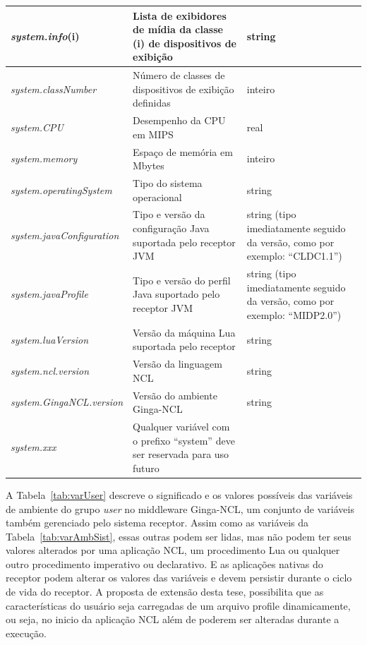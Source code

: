 \begin{table}[!ht]
{\begin{tabular}{|p{4.5cm}|p{6cm}|p{4.2cm}|}
    \textit{system.info}(i) & Lista de exibidores de mídia da classe (i) de dispositivos de exibição & string \\\hline
    \textit{system.classNumber} & Número de classes de dispositivos de exibição definidas & inteiro \\\hline
    \textit{system.CPU} & Desempenho da CPU em MIPS & real \\\hline
    \textit{system.memory} & Espaço de memória em Mbytes & inteiro \\\hline
    \textit{system.operatingSystem} & Tipo do sistema operacional & string \\\hline
    \textit{system.javaConfiguration} & Tipo e versão da configuração Java suportada pelo receptor JVM & string (tipo imediatamente seguido da versão, como por exemplo:         “CLDC1.1”) \\\hline
    \textit{system.javaProfile }& Tipo e versão do perfil Java suportado pelo receptor JVM & string (tipo imediatamente seguido da versão, como por exemplo: “MIDP2.0”) \\\hline
    \textit{system.luaVersion} & Versão da máquina Lua suportada pelo receptor & string \\\hline
    \textit{system.ncl.version} & Versão da linguagem NCL & string \\\hline
    \textit{system.GingaNCL.version} & Versão do ambiente Ginga-NCL & string \\\hline
    \textit{system.xxx} & Qualquer variável com o prefixo “system” deve ser reservada para uso futuro & \\\hline
 \end{tabular}
}
\end{table}

A Tabela~\ref{tab:varUser} descreve o significado e os valores possíveis das variáveis de ambiente do grupo \textit{user} no middleware Ginga-NCL, um conjunto de variáveis também gerenciado pelo sistema receptor. Assim como as variáveis da Tabela~\ref{tab:varAmbSist}, essas outras podem ser lidas, mas não podem ter seus valores alterados por uma aplicação NCL, um procedimento Lua ou qualquer outro procedimento imperativo ou declarativo. E as aplicações nativas do receptor podem alterar os valores das variáveis e devem persistir durante o ciclo de vida do receptor. A proposta de extensão desta tese, possibilita que as características do usuário seja carregadas de um arquivo profile dinamicamente, ou seja, no inicio da aplicação NCL além de poderem ser alteradas durante a execução. 

